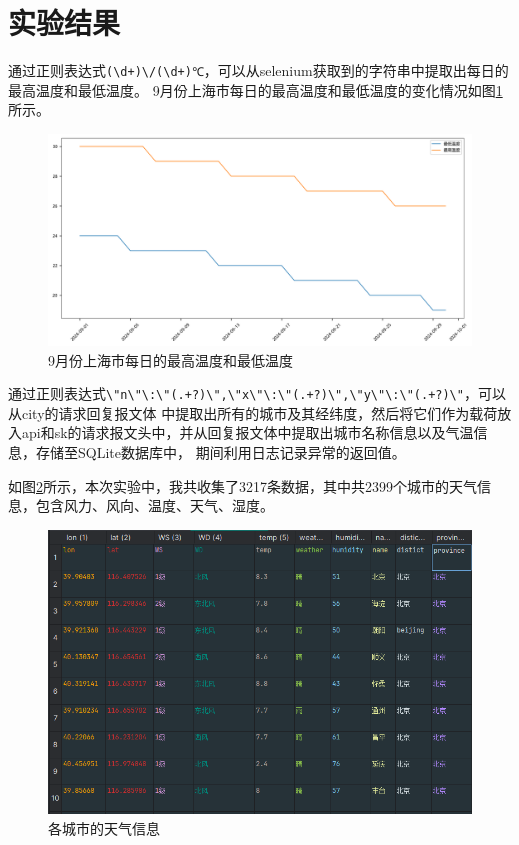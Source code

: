 \section{实验结果}
通过正则表达式\verb|(\d+)\/(\d+)℃|，可以从selenium获取到的字符串中提取出每日的最高温度和最低温度。
9月份上海市每日的最高温度和最低温度的变化情况如图\ref{maxmin}所示。
\begin{figure}[!htbp]
    \centering
    \includegraphics[width=\textwidth]{figures/max_min.png}
    \caption{9月份上海市每日的最高温度和最低温度}\label{maxmin}
\end{figure}

通过正则表达式\verb|\"n\"\:\"(.+?)\",\"x\"\:\"(.+?)\",\"y\"\:\"(.+?)\"|，可以从city的请求回复报文体
中提取出所有的城市及其经纬度，然后将它们作为载荷放入api和sk的请求报文头中，并从回复报文体中提取出城市名称信息以及气温信息，存储至SQLite数据库中，
期间利用日志记录异常的返回值。

如图\ref{csv}所示，本次实验中，我共收集了3217条数据，其中共2399个城市的天气信息，包含风力、风向、温度、天气、湿度。

\begin{figure}[!htbp]
    \centering
    \includegraphics[width=\textwidth]{figures/csv.png}
    \caption{各城市的天气信息}\label{csv}
\end{figure}
